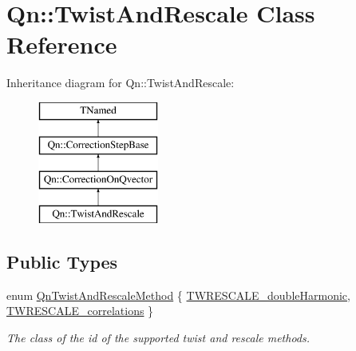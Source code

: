 \hypertarget{classQn_1_1TwistAndRescale}{}\section{Qn\+:\+:Twist\+And\+Rescale Class Reference}
\label{classQn_1_1TwistAndRescale}
Inheritance diagram for Qn\+:\+:Twist\+And\+Rescale\+:\begin{figure}[H]
\begin{center}
\leavevmode
\includegraphics[height=4.000000cm]{classQn_1_1TwistAndRescale}
\end{center}
\end{figure}
\subsection*{Public Types}
\begin{DoxyCompactItemize}
\item 
enum \mbox{\hyperlink{classQn_1_1TwistAndRescale_a04bae5b47174d3536e1f6ac8499b982f}{Qn\+Twist\+And\+Rescale\+Method}} \{ \mbox{\hyperlink{classQn_1_1TwistAndRescale_a04bae5b47174d3536e1f6ac8499b982fade06f7c20fc674951b236bbfb0012a6a}{T\+W\+R\+E\+S\+C\+A\+L\+E\+\_\+double\+Harmonic}}, 
\mbox{\hyperlink{classQn_1_1TwistAndRescale_a04bae5b47174d3536e1f6ac8499b982fad0d9e217f4cd21ef50a93fa165d235d4}{T\+W\+R\+E\+S\+C\+A\+L\+E\+\_\+correlations}}
 \}
\begin{DoxyCompactList}\small\item\em The class of the id of the supported twist and rescale methods. \end{DoxyCompactList}\end{DoxyCompactItemize}
